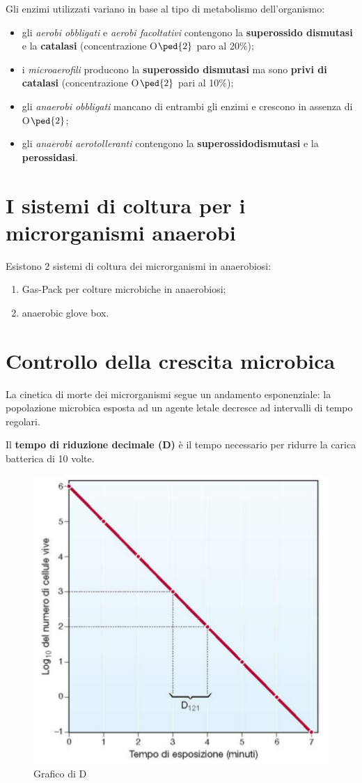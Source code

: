 \documentclass[11pt]{book}
\begin{document}
Gli enzimi utilizzati variano in base al tipo di metabolismo dell'organismo:
\begin{itemize}
\item gli \emph{aerobi obbligati} e \emph{aerobi facoltativi} contengono la \textbf{superossido dismutasi} e la \textbf{catalasi} (concentrazione O$\ped{2}$ paro al 20$\%$);
\item i \emph{microaerofili} producono la \textbf{superossido dismutasi} ma sono \textbf{privi di catalasi} (concentrazione O$\ped{2}$ pari al 10$\%$);
\item gli \emph{anaerobi obbligati} mancano di entrambi gli enzimi e crescono in assenza di O$\ped{2}$;
\item gli \emph{anaerobi aerotolleranti} contengono la \textbf{superossidodismutasi} e la \textbf{perossidasi}.
\end{itemize}


\section{I sistemi di coltura per i microrganismi anaerobi}
Esistono 2 sistemi di coltura dei microrganismi in anaerobiosi:
\begin{enumerate}
\item Gas-Pack per colture microbiche in anaerobiosi;
\item anaerobic glove box.
\end{enumerate}

\section{Controllo della crescita microbica}
La cinetica di morte dei microrganismi segue un andamento esponenziale: la popolazione microbica esposta ad un agente letale decresce ad intervalli di tempo regolari. 

Il \textbf{tempo di riduzione decimale (D)} è il tempo necessario per ridurre la carica batterica di 10 volte.

\begin{figure}[htp]
\centering
\includegraphics[scale=0.5]{img/Tempo di riduzione decimale.png}
\caption{Grafico di D}
\label{}
\end{figure}
\end{document}
